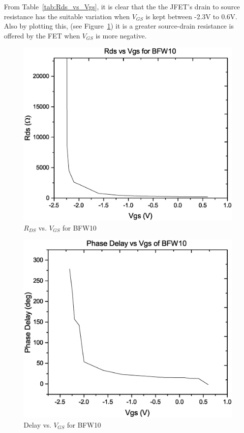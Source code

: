 \documentclass[]{risa}
\begin{document}
From Table~\ref{tab:Rds_vs_Vgs},  it is clear that the the JFET's drain to source resistance has the suitable variation when $V_{GS}$ is kept between -2.3V to 0.6V.
Also by plotting this, (see Figure~\ref{fig:rds_vs_vgs}) it is a greater source-drain resistance is offered by the FET when $V_{GS}$ is more negative.

\begin{figure}[htbp]
    \centering
    \includegraphics[width=\columnwidth]{rds_vs_vgs.eps}
    \caption{$R_{DS}$ vs. $V_{GS}$ for BFW10}
    \label{fig:rds_vs_vgs}
\end{figure}

\begin{figure}[htbp]
    \centering
    \includegraphics[width=\columnwidth]{Delay_vs_VT.eps}
    \caption{Delay vs. $V_{GS}$ for BFW10}
    \label{fig:delay_vs_VT}
\end{figure}
\end{document}
